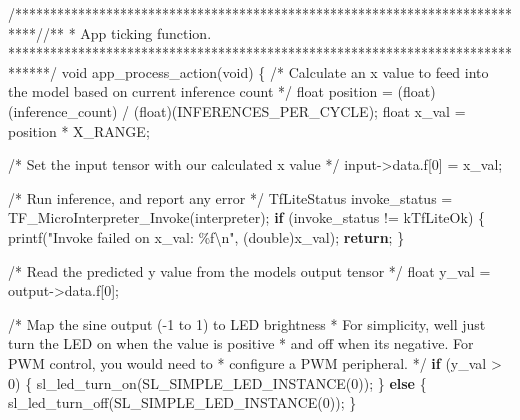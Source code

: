 \documentclass[
  9pt,
  letterpaper,
  abstract,
  titlepage]{scrbook}
\newenvironment{Shaded}{\begin{snugshade}}{\end{snugshade}}
\newcommand{\CommentTok}[1]{\textcolor[rgb]{0.37,0.37,0.37}{#1}}
\newcommand{\ControlFlowTok}[1]{\textcolor[rgb]{0.00,0.23,0.31}{\textbf{#1}}}
\newcommand{\DataTypeTok}[1]{\textcolor[rgb]{0.68,0.00,0.00}{#1}}
\newcommand{\DecValTok}[1]{\textcolor[rgb]{0.68,0.00,0.00}{#1}}
\newcommand{\NormalTok}[1]{\textcolor[rgb]{0.00,0.23,0.31}{#1}}
\newcommand{\OperatorTok}[1]{\textcolor[rgb]{0.37,0.37,0.37}{#1}}
\newcommand{\SpecialCharTok}[1]{\textcolor[rgb]{0.37,0.37,0.37}{#1}}
\newcommand{\StringTok}[1]{\textcolor[rgb]{0.13,0.47,0.30}{#1}}
\begin{document}
\begin{Shaded}
\begin{Highlighting}[]
\CommentTok{/***************************************************************************//**}
\CommentTok{ * App ticking function.}
\CommentTok{ ******************************************************************************/}
\DataTypeTok{void}\NormalTok{ app\_process\_action}\OperatorTok{(}\DataTypeTok{void}\OperatorTok{)}
\OperatorTok{\{}
  \CommentTok{/* Calculate an x value to feed into the model based on current inference count */}
  \DataTypeTok{float}\NormalTok{ position }\OperatorTok{=} \OperatorTok{(}\DataTypeTok{float}\OperatorTok{)(}\NormalTok{inference\_count}\OperatorTok{)} \OperatorTok{/} \OperatorTok{(}\DataTypeTok{float}\OperatorTok{)(}\NormalTok{INFERENCES\_PER\_CYCLE}\OperatorTok{);}
  \DataTypeTok{float}\NormalTok{ x\_val }\OperatorTok{=}\NormalTok{ position }\OperatorTok{*}\NormalTok{ X\_RANGE}\OperatorTok{;}
  
  \CommentTok{/* Set the input tensor with our calculated x value */}
\NormalTok{  input}\OperatorTok{{-}\textgreater{}}\NormalTok{data}\OperatorTok{.}\NormalTok{f}\OperatorTok{[}\DecValTok{0}\OperatorTok{]} \OperatorTok{=}\NormalTok{ x\_val}\OperatorTok{;}
  
  \CommentTok{/* Run inference, and report any error */}
\NormalTok{  TfLiteStatus invoke\_status }\OperatorTok{=}\NormalTok{ TF\_MicroInterpreter\_Invoke}\OperatorTok{(}\NormalTok{interpreter}\OperatorTok{);}
  \ControlFlowTok{if} \OperatorTok{(}\NormalTok{invoke\_status }\OperatorTok{!=}\NormalTok{ kTfLiteOk}\OperatorTok{)} \OperatorTok{\{}
\NormalTok{    printf}\OperatorTok{(}\StringTok{"Invoke failed on x\_val: }\SpecialCharTok{\%f\textbackslash{}n}\StringTok{"}\OperatorTok{,} \OperatorTok{(}\DataTypeTok{double}\OperatorTok{)}\NormalTok{x\_val}\OperatorTok{);}
    \ControlFlowTok{return}\OperatorTok{;}
  \OperatorTok{\}}
  
  \CommentTok{/* Read the predicted y value from the model\textquotesingle{}s output tensor */}
  \DataTypeTok{float}\NormalTok{ y\_val }\OperatorTok{=}\NormalTok{ output}\OperatorTok{{-}\textgreater{}}\NormalTok{data}\OperatorTok{.}\NormalTok{f}\OperatorTok{[}\DecValTok{0}\OperatorTok{];}
  
  \CommentTok{/* Map the sine output ({-}1 to 1) to LED brightness }
\CommentTok{   * For simplicity, we\textquotesingle{}ll just turn the LED on when the value is positive}
\CommentTok{   * and off when it\textquotesingle{}s negative. For PWM control, you would need to }
\CommentTok{   * configure a PWM peripheral. */}
  \ControlFlowTok{if} \OperatorTok{(}\NormalTok{y\_val }\OperatorTok{\textgreater{}} \DecValTok{0}\OperatorTok{)} \OperatorTok{\{}
\NormalTok{    sl\_led\_turn\_on}\OperatorTok{(}\NormalTok{SL\_SIMPLE\_LED\_INSTANCE}\OperatorTok{(}\DecValTok{0}\OperatorTok{));}
  \OperatorTok{\}} \ControlFlowTok{else} \OperatorTok{\{}
\NormalTok{    sl\_led\_turn\_off}\OperatorTok{(}\NormalTok{SL\_SIMPLE\_LED\_INSTANCE}\OperatorTok{(}\DecValTok{0}\OperatorTok{));}
  \OperatorTok{\}}
  

\end{Highlighting}
\end{Shaded}
\end{document}
